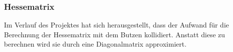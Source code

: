 \subsubsection{Hessematrix}
Im Verlauf des Projektes hat sich herausgestellt, dass der Aufwand für die Berechnung der Hessematrix mit dem Butzen kollidiert. Anstatt diese zu berechnen wird sie durch eine Diagonalmatrix approximiert.
